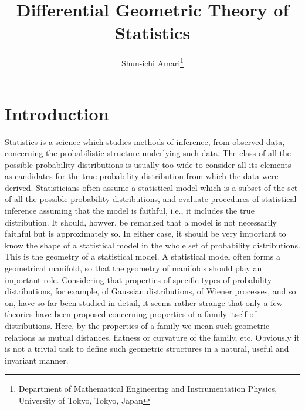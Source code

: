 \documentclass[11pt]{article}
\begin{document}
\newcommand{\tr}{\text{tr}}
\newcommand{\E}{\textbf{E}}
\newcommand{\diag}{\text{diag}}
\newcommand{\argmax}{\text{argmax}}
\newcommand{\argmin}{\text{argmin}}
\newcommand{\Cov}{\text{Cov}}
\newcommand{\Vol}{\text{Vol}}

\title{Differential Geometric Theory of Statistics}

\author{Shun-ichi Amari\thanks{
Department of Mathematical Engineering and Instrumentation Physics, University of Tokyo, Tokyo, Japan}}

\maketitle

\tableofcontents

\section{Introduction}

       
            Statistics is a science which studies methods of inference, from
observed data, concerning the probabilistic structure underlying such data.
The class of all the possible probability distributions is usually too wide to
consider all its elements as candidates for the true probability distribution
from which the data were derived.  Statisticians often assume a statistical
model which is a subset of the set of all the possible probability distribut{ions,}
      and evaluate procedures of statistical inference assuming that the model
is faithful, i.e., it includes the true distribution.  It should, howver, be
remarked that a model is not necessarily faithful but is approximately so.  In
either case, it should be very important to know the shape of a statistical
model in the whole set of probability distributions.  This is the geometry of a
statistical model.  A statistical model often forms a geometrical manifold, so
that the geometry of manifolds should play an important role.  Considering that
properties of specific types of probability distributions, for example, of
Gaussian distributions, of Wiener processes, and so on, have so far been studied
in detail, it seems rather strange that only a few theories have been proposed
concerning properties of a family itself of distributions.  Here, by the proper{ties}
     of a family we mean such geometric relations as mutual distances, flatness
or curvature of the family, etc.  Obviously it is not a trivial task to define 
such geometric structures in a natural, useful and invariant manner.
\end{document}
